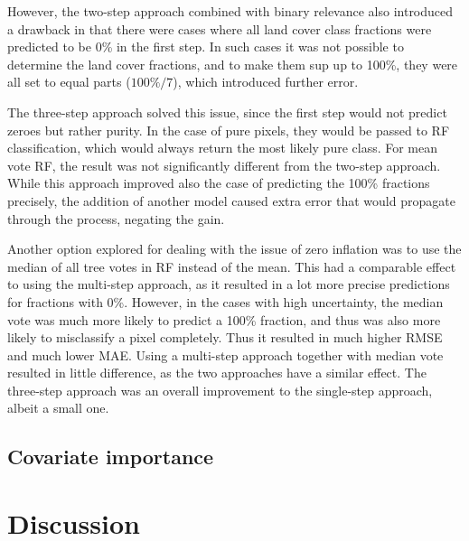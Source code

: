 \documentclass[a4paper,10pt]{article}
\begin{document}
However, the two-step approach combined with binary relevance also introduced a drawback in that there were cases where all land cover class fractions were predicted to be 0\% in the first step.
In such cases it was not possible to determine the land cover fractions, and to make them sup up to 100\%, they were all set to equal parts ($100\% / 7$), which introduced further error.

The three-step approach solved this issue, since the first step would not predict zeroes but rather purity.
In the case of pure pixels, they would be passed to \gls{RF} classification, which would always return the most likely pure class.
For mean vote \gls{RF}, the result was not significantly different from the two-step approach.
While this approach improved also the case of predicting the 100\% fractions precisely, the addition of another model caused extra error that would propagate through the process, negating the gain.

Another option explored for dealing with the issue of zero inflation was to use the median of all tree votes in \gls{RF} instead of the mean.
This had a comparable effect to using the multi-step approach, as it resulted in a lot more precise predictions for fractions with 0\%.
However, in the cases with high uncertainty, the median vote was much more likely to predict a 100\% fraction, and thus was also more likely to misclassify a pixel completely.
Thus it resulted in much higher \gls{RMSE} and much lower \gls{MAE}.
Using a multi-step approach together with median vote resulted in little difference, as the two approaches have a similar effect.
The three-step approach was an overall improvement to the single-step approach, albeit a small one.

\subsection{Covariate importance}

\section{Discussion}
\end{document}
